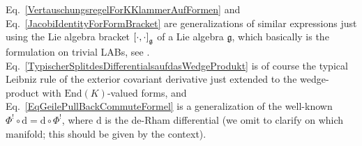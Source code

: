 \begin{remarkohne}
\leavevmode\newline
Eq.~\eqref{VertauschungsregelForKKlammerAufFormen} and Eq.~\eqref{JacobiIdentityForFormBracket} are generalizations of similar expressions just using the Lie algebra bracket $\mleft[ \cdot, \cdot\mright]_{\mathfrak{g}}$ of a Lie algebra $\mathfrak{g}$, which basically is the formulation on trivial LABs, see \cite[\S 5, first and second statement of Exercise 5.15.14; page 316]{hamilton}. Eq.~\eqref{TypischerSplitdesDifferentialsaufdasWedgeProdukt} is of course the typical Leibniz rule of the exterior covariant derivative just extended to the wedge-product with $\mathrm{End}(K)$-valued forms, and Eq.~\eqref{EqGeilePullBackCommuteFormel} is a generalization of the well-known $\Phi^! \circ \mathrm{d} = \mathrm{d} \circ \Phi^!$, where $\mathrm{d}$ is the de-Rham differential (we omit to clarify on which manifold; this should be given by the context).
\end{remarkohne}

